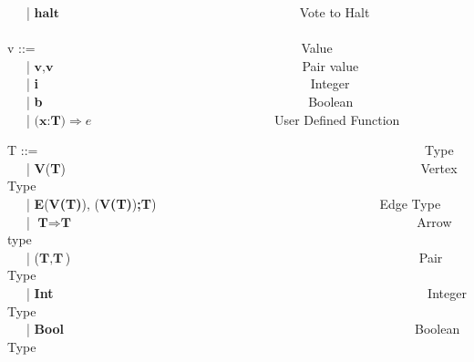 \begin{frame}
{  \ \ \ |  $\textbf{halt}$ \ \ \ \  \ \ \ \ \ \ \ \  \ \ \ \ \ \ \ \ \ \ \ \ \ \ \ \ \ \ \ \ \ \ \ \ \ Vote to Halt \\
\ \\
  v ::= \ \ \ \ \ \ \ \ \ \ \ \ \ \ \ \ \ \ \ \ \ \ \ \ \ \ \ \ \ \ \ \ \ \ \ \ \ \ \ \ \ Value \\
    \ \ \ | $\textbf{v},\textbf{v}$ \ \ \ \ \ \ \ \ \ \ \ \ \ \ \ \ \ \ \ \ \ \ \ \ \ \ \ \ \ \ \ \ \ \ \ \ \ \ Pair value \\
    \ \ \ | \textbf{i} \ \ \ \ \ \ \ \ \ \ \ \ \ \ \ \  \ \ \ \ \ \ \ \ \ \ \ \ \ \ \ \ \ \ \ \ \ \ \ \ \ \ Integer \\
    \ \ \ | \textbf{b} \ \ \ \ \ \ \ \ \ \ \ \ \ \ \ \ \ \ \ \ \ \ \ \ \ \ \ \ \ \ \ \ \ \ \ \ \ \ \ \ \ Boolean \\
    \ \ \ | $\textbf{(x:T)} \Rightarrow e $ \ \ \ \ \ \ \ \ \ \ \ \ \ \ \ \ \ \ \ \ \ \ \ \ \ \ \ \  User Defined Function \\
    }
\end{frame}

\begin{frame}
  \tiny{
  T ::= \ \ \ \ \ \ \ \ \ \ \ \ \ \ \ \ \ \ \ \ \ \ \ \ \ \ \ \ \ \ \ \ \ \ \ \ \ \ \ \ \ \ \ \ \ \ \ \ \ \ \ \ \ \ \ \ \ \ \ \ Type \\
    \ \ \ | \textbf{V}(\textbf{T}) \ \ \ \ \ \ \ \ \ \ \ \ \ \ \ \ \ \ \ \ \ \ \ \ \ \ \ \ \ \ \ \ \ \ \ \ \ \ \ \ \ \ \ \ \ \ \ \ \ \ \ \ \ \ \ Vertex Type \\
    \ \ \ | \textbf{E}(\textbf{V(T)}), (\textbf{V(T)})\textbf{;T})\ \ \ \ \ \ \ \ \ \ \ \ \ \ \ \ \ \ \ \ \ \ \ \ \ \ \ \ \ \ \ \ \ \ \  Edge Type\\
    \ \ \ | $\textbf{T} \Rightarrow \textbf{T}$ \ \ \ \ \ \ \ \ \ \  \ \ \ \ \ \ \ \ \ \ \ \ \ \ \ \ \ \ \ \ \ \ \ \ \ \ \ \ \ \  \ \ \ \ \ \ \ \ \ \ \ \ \ Arrow type \\
    \ \ \ | ($\textbf{T}, \textbf{T}$) \ \ \ \ \ \ \ \ \ \ \ \ \ \ \ \ \ \ \ \ \ \ \ \ \ \ \ \ \ \ \ \ \ \ \ \ \ \ \ \ \ \ \ \ \ \ \ \ \ \ \ \ \ \ Pair Type \\
    \ \ \ | \textbf{Int} \ \ \ \ \ \ \ \ \ \ \ \ \ \ \ \ \ \ \ \ \ \ \ \ \ \ \ \ \ \ \ \ \ \ \ \ \ \ \ \ \ \ \ \ \ \ \ \ \ \ \ \ \ \ \ \ \ \ Integer Type \\
    \ \ \ | \textbf{Bool}\ \ \ \ \ \ \ \ \ \ \ \  \ \ \ \ \ \ \ \ \ \ \ \ \ \ \ \ \ \ \ \ \ \ \ \ \ \ \ \ \ \ \ \ \ \ \ \ \ \ \ \ \ \ \  Boolean Type
}
\end{frame}

